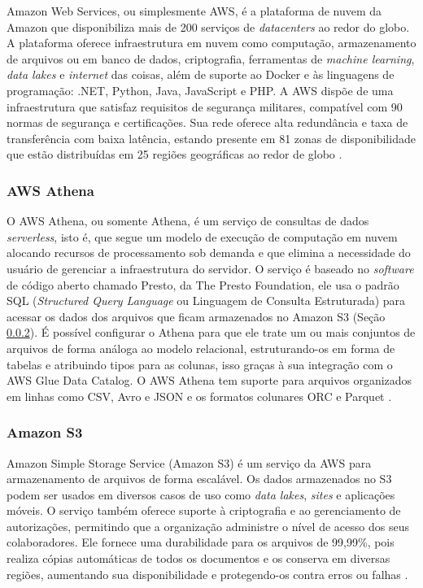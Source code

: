 Amazon Web Services, ou simplesmente AWS, é a plataforma de nuvem da Amazon que disponibiliza mais de 200 serviços de \textit{datacenters} ao redor do globo. A plataforma oferece infraestrutura em nuvem como computação, armazenamento de arquivos ou em banco de dados, criptografia, ferramentas de \textit{machine learning}, \textit{data lakes} e \textit{internet} das coisas, além de suporte ao Docker e às linguagens de programação: .NET, Python, Java, JavaScript e PHP. A AWS dispõe de uma infraestrutura que satisfaz requisitos de segurança militares, compatível com 90 normas de segurança e certificações. Sua rede oferece alta redundância e taxa de transferência com baixa latência, estando presente em 81 zonas de disponibilidade que estão distribuídas em 25 regiões geográficas ao redor de globo \cite{aws:about}.

\subsubsection{AWS Athena}
\label{subsec:athena}

O AWS Athena, ou somente Athena, é um serviço de consultas de dados \textit{serverless}, isto é, que segue um modelo de execução de computação em nuvem alocando recursos de processamento sob demanda e que elimina a necessidade do usuário de gerenciar a infraestrutura do servidor. O serviço é baseado no \textit{software} de código aberto chamado Presto, da The Presto Foundation, ele usa o padrão SQL (\textit{Structured Query Language} ou Linguagem de Consulta Estruturada) para acessar os dados dos arquivos que ficam armazenados no Amazon S3 (Seção \ref{subsec:s3}). É possível configurar o Athena para que ele trate um ou mais conjuntos de arquivos de forma análoga ao modelo relacional, estruturando-os em forma de tabelas e atribuindo tipos para as colunas, isso graças à sua integração com o AWS Glue Data Catalog. O AWS Athena tem suporte para arquivos organizados em linhas como CSV, Avro e JSON e os formatos colunares ORC e Parquet \cite{aws:athena}.

\subsubsection{Amazon S3}
\label{subsec:s3}

Amazon Simple Storage Service (Amazon S3) é um serviço da AWS para armazenamento de arquivos de forma escalável. Os dados armazenados no S3 podem ser usados em diversos casos de uso como \textit{data lakes}, \textit{sites} e aplicações móveis. O serviço também oferece suporte à criptografia e ao gerenciamento de autorizações, permitindo que a organização administre o nível de acesso dos seus colaboradores. Ele fornece uma durabilidade para os arquivos de 99,99\%, pois realiza cópias automáticas de todos os documentos e os conserva em diversas regiões, aumentando sua disponibilidade e protegendo-os contra erros ou falhas \cite{aws:s3}.



